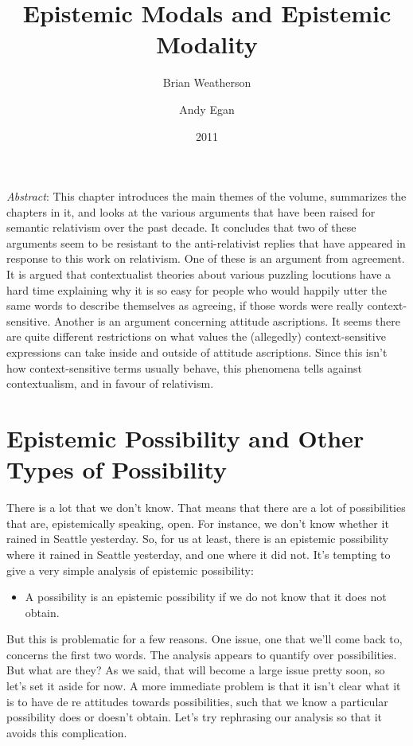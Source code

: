 \documentclass[
  11pt,
  letterpaper,
  DIV=11,
  numbers=noendperiod,
  twoside]{scrartcl}
\title{Epistemic Modals and Epistemic Modality}
\author{Brian Weatherson \and Andy Egan}
\date{2011}
\providecommand{\tightlist}{%
  \setlength{\itemsep}{0pt}\setlength{\parskip}{0pt}}
\renewenvironment{abstract}
 {\vspace{-1.25cm}
 \quotation\small\noindent\emph{Abstract}:}
 {\endquotation}
\renewenvironment{abstract}
 {\quotation\small\noindent\emph{Abstract}:}
 {\endquotation\vspace{-0.02cm}}
\begin{document}
\maketitle
\begin{abstract}
This chapter introduces the main themes of the volume, summarizes the
chapters in it, and looks at the various arguments that have been raised
for semantic relativism over the past decade. It concludes that two of
these arguments seem to be resistant to the anti-relativist replies that
have appeared in response to this work on relativism. One of these is an
argument from agreement. It is argued that contextualist theories about
various puzzling locutions have a hard time explaining why it is so easy
for people who would happily utter the same words to describe themselves
as agreeing, if those words were really context-sensitive. Another is an
argument concerning attitude ascriptions. It seems there are quite
different restrictions on what values the (allegedly) context-sensitive
expressions can take inside and outside of attitude ascriptions. Since
this isn't how context-sensitive terms usually behave, this phenomena
tells against contextualism, and in favour of relativism.
\end{abstract}


\section{Epistemic Possibility and Other Types of
Possibility}\label{epistemic-possibility-and-other-types-of-possibility}

There is a lot that we don't know. That means that there are a lot of
possibilities that are, epistemically speaking, open. For instance, we
don't know whether it rained in Seattle yesterday. So, for us at least,
there is an epistemic possibility where it rained in Seattle yesterday,
and one where it did not. It's tempting to give a very simple analysis
of epistemic possibility:

\begin{itemize}
\tightlist
\item
  A possibility is an epistemic possibility if we do not know that it
  does not obtain.
\end{itemize}

But this is problematic for a few reasons. One issue, one that we'll
come back to, concerns the first two words. The analysis appears to
quantify over possibilities. But what are they? As we said, that will
become a large issue pretty soon, so let's set it aside for now. A more
immediate problem is that it isn't clear what it is to have de re
attitudes towards possibilities, such that we know a particular
possibility does or doesn't obtain. Let's try rephrasing our analysis so
that it avoids this complication.
\end{document}
